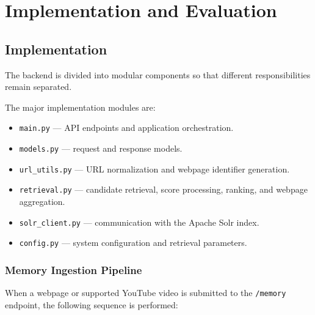 \documentclass{tietreport}
\begin{document}

\chapter{Implementation and Evaluation}

\section{Implementation}

The backend is divided into modular components so that
different responsibilities remain separated.

The major implementation modules are:

\begin{itemize}

    \item \texttt{main.py} --- API endpoints and application
    orchestration.

    \item \texttt{models.py} --- request and response models.

    \item \texttt{url\_utils.py} --- URL normalization and
    webpage identifier generation.

    \item \texttt{retrieval.py} --- candidate retrieval,
    score processing, ranking, and webpage aggregation.

    \item \texttt{solr\_client.py} --- communication with the
    Apache Solr index.

    \item \texttt{config.py} --- system configuration and
    retrieval parameters.

\end{itemize}

\subsection{Memory Ingestion Pipeline}

When a webpage or supported YouTube video is submitted to the
\texttt{/memory} endpoint, the following sequence is performed:
\end{document}

